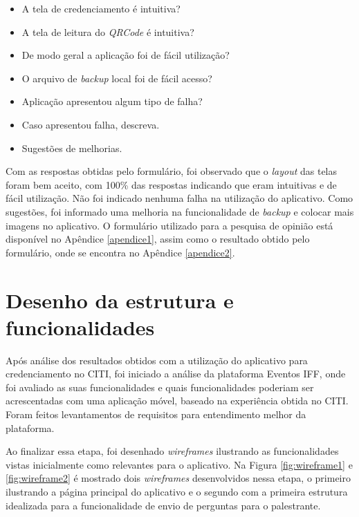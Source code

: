 \begin{itemize}
    \item A tela de credenciamento é intuitiva?
    \item A tela de leitura do \textit{QRCode} é intuitiva?
    \item De modo geral a aplicação foi de fácil utilização?
    \item O arquivo de \textit{backup} local foi de fácil acesso?
    \item Aplicação apresentou algum tipo de falha?
    \item Caso apresentou falha, descreva.
    \item Sugestões de melhorias.
\end{itemize}

Com as respostas obtidas pelo formulário, foi observado que o \textit{layout} das telas foram bem aceito, com 100\% das respostas indicando que eram intuitivas e de fácil utilização. Não foi indicado nenhuma falha na utilização do aplicativo. Como sugestões, foi informado uma melhoria na funcionalidade de \textit{backup} e colocar mais imagens no aplicativo. O formulário utilizado para a pesquisa de opinião está disponível no Apêndice \ref{apendice1}, assim como o resultado obtido pelo formulário, onde se encontra no Apêndice \ref{apendice2}.

\section{Desenho da estrutura e funcionalidades}

Após análise dos resultados obtidos com a utilização do aplicativo para credenciamento no CITI, foi iniciado a análise da plataforma Eventos IFF, onde foi avaliado as suas funcionalidades e quais funcionalidades poderiam ser acrescentadas com uma aplicação móvel, baseado na experiência obtida no CITI. Foram feitos levantamentos de requisitos para entendimento melhor da plataforma. 

Ao finalizar essa etapa, foi desenhado \textit{wireframes} ilustrando as funcionalidades vistas inicialmente como relevantes para o aplicativo. Na Figura \ref{fig:wireframe1} e \ref{fig:wireframe2} é mostrado dois \textit{wireframes} desenvolvidos nessa etapa, o primeiro ilustrando a página principal do aplicativo e o segundo com a primeira estrutura idealizada para a funcionalidade de envio de perguntas para o palestrante.


